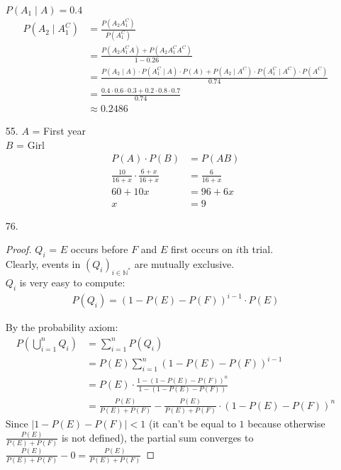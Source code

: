\documentclass{article}
\begin{document}
\begin{itemize}
  $P(A_1 \mid A) = 0.4$\\
  \begin{equation*}
    \begin{split}
      P(A_2 \mid A_1^C)
      &= \frac{P(A_2A_1^C)}{P(A_1^C)}\\
      &= \frac{P(A_2A_1^CA)+P(A_2A_1^CA^C)}{1-0.26}\\
      &= \frac{P(A_2 \mid A)\cdot P(A_1^C \mid A) \cdot P(A) +  P(A_2 \mid A^C)\cdot P(A_1^C \mid A^C) \cdot P(A^C)}{0.74}\\
      &= \frac{0.4 \cdot 0.6 \cdot 0.3 + 0.2 \cdot 0.8 \cdot 0.7}{0.74}\\
      &\approx 0.2486
    \end{split}
  \end{equation*}
\item [55.]
  $A$ = First year\\
  $B$ = Girl\\
  \begin{equation*}    \begin{split}
      P(A)\cdot P(B) &= P(AB)\\
      \frac{10}{16+x}\cdot \frac{6+x}{16+x} &= \frac{6}{16+x}\\
      60 + 10x &= 96+6x\\
      x &= 9
    \end{split}
\end{equation*}

\item [76.]
  \begin{proof}
  $Q_i$ = $E$ occurs before $F$ and $E$ first occurs on $i$th trial.\\
  Clearly, events in $(Q_i)_{i \in \mathbb{N}^*}$ are mutually exclusive.\\
  $Q_i$ is very easy to compute:
  \begin{equation*}
    \begin{split}
      P(Q_i) = (1-P(E)-P(F))^{i-1} \cdot P(E)
    \end{split}
  \end{equation*}

  
  By the probability axiom:
  \begin{equation*}
    \begin{split}
      P(\bigcup_{i=1}^{n} Q_i) &= \sum_{i=1}^{n} P(Q_i)\\
      &= P(E)\sum_{i=1}^{n} (1-P(E)-P(F))^{i-1}\\
      &= P(E) \cdot \frac{1-(1-P(E)-P(F))^n}{1-(1-P(E)-P(F))}\\
      &= \frac{P(E)}{P(E)+P(F)} - \frac{P(E)}{P(E)+P(F)} \cdot (1-P(E)-P(F))^n
\end{split}
\end{equation*}
Since $|1-P(E)-P(F)| < 1$ (it can't be equal to $1$ because otherwise $\frac{P(E)}{P(E)+P(F)}$ is not defined),
the partial sum converges to $\frac{P(E)}{P(E)+P(F)} - 0 = \frac{P(E)}{P(E)+P(F)}$
\end{proof}

\end{itemize}
\end{document}
